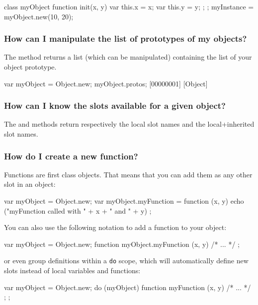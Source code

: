 \begin{urbiunchecked}
class myObject
{
  function init(x, y)
  {
    var this.x = x;
    var this.y = y;
  };
};
myInstance = myObject.new(10, 20);
\end{urbiunchecked}


\subsubsection{How can I manipulate the list of prototypes of my objects?}
The  method returns a list (which can be manipulated)
containing the list of your object prototype.

\begin{urbiunchecked}
var myObject = Object.new;
myObject.protos;
[00000001] [Object]
\end{urbiunchecked}

\subsubsection{How can I know the slots available for a given object?}
The  and  methods
return respectively the local slot names and the local+inherited slot
names.

\subsubsection{How do I create a new function?}
Functions are first class objects. That means that you can add them as
any other slot in an object:

\begin{urbiunchecked}
var myObject = Object.new;
var myObject.myFunction = function (x, y)
  { echo ("myFunction called with " + x + " and " + y) };
\end{urbiunchecked}

You can also use the following notation to add a function to your
object:

\begin{urbiunchecked}
var myObject = Object.new;
function myObject.myFunction (x, y) { /* ... */ };
\end{urbiunchecked}

\noindent
or even group definitions within a \lstinline{do} scope, which will
automatically define new slots instead of local variables and
functions:

\begin{urbiunchecked}
var myObject = Object.new;
do (myObject)
{
  function myFunction (x, y) { /* ... */ };
};
\end{urbiunchecked}


